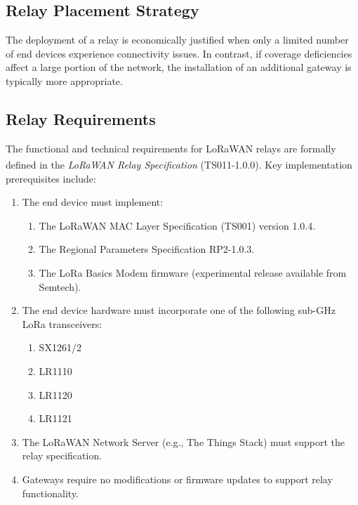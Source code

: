 \subsection{Relay Placement Strategy}

The deployment of a relay is economically justified when only a limited number of end devices experience connectivity issues. In contrast, if coverage deficiencies affect a large portion of the network, the installation of an additional gateway is typically more appropriate.

\subsection{Relay Requirements}

The functional and technical requirements for LoRaWAN relays are formally defined in the \emph{LoRaWAN\textsuperscript{\textregistered} Relay Specification} (TS011-1.0.0). Key implementation prerequisites include:

\begin{enumerate}
    \item The end device must implement:
          \begin{enumerate}
              \item The LoRaWAN MAC Layer Specification (TS001) version 1.0.4.
              \item The Regional Parameters Specification RP2-1.0.3.
              \item The LoRa Basics Modem firmware (experimental release available from Semtech).
          \end{enumerate}

    \item The end device hardware must incorporate one of the following sub-GHz LoRa transceivers:
          \begin{enumerate}
              \item SX1261/2
              \item LR1110
              \item LR1120
              \item LR1121
          \end{enumerate}

    \item The LoRaWAN Network Server (e.g., The Things Stack) must support the relay specification.

    \item Gateways require no modifications or firmware updates to support relay functionality.
\end{enumerate}

